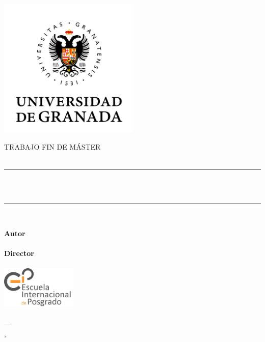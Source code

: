 \documentclass[../main.tex]{memoir}
\begin{document}
\begin{titlingpage}

  \newlength{\centeroffset}
  \setlength{\centeroffset}{-0.5\oddsidemargin}
  \addtolength{\centeroffset}{0.5\evensidemargin}
  \thispagestyle{empty}

  \noindent\hspace*{\centeroffset}
  \begin{minipage}{\textwidth}
    \vspace{-2cm}
    \centering
    \includegraphics[width=0.5\textwidth]{images/logo_ugr.png}

   \textsc{ \Large TRABAJO FIN DE MÁSTER\\[0.2cm]}
    \textsc{ \Degree \\[0.5cm]}
    
    {\Large\bfseries
    	\noindent\rule[-1ex]{\textwidth}{1pt}\\[2ex]
    	\ProjectTitle\\
    }
    \noindent\rule[-1ex]{\textwidth}{3pt}\\[2ex]
  \end{minipage}

  \vspace{1.5cm}
  \noindent\hspace*{\centeroffset}\begin{minipage}{\textwidth}
    \centering

    \textbf{Autor}\\ {\AuthorName}\\[2ex]
    \textbf{Director}\\
    {\MainProf}\\[1cm]
   \includegraphics[height=2cm]{images/logo_eip.jpeg}\\[1cm]
   \textsc{\FacultyOne}\\
    \textsc{---}\\
    \Location, \Time
  \end{minipage}

\end{titlingpage}
\end{document}
